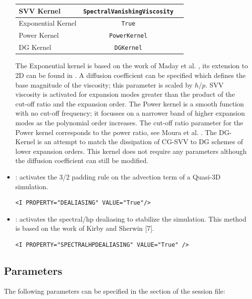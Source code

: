 \begin{itemize}
\begin{center}
\footnotesize
\begin{tabular}{lcc}
\toprule
{SVV Kernel} & {\texttt{SpectralVanishingViscosity}} \\
\midrule
Exponential Kernel & \texttt{True} \\
Power Kernel & \texttt{PowerKernel} \\
DG Kernel & \texttt{DGKernel} \\
\bottomrule
\end{tabular}
\end{center}

The Exponential kernel is based on the work of Maday et al. \cite{yvsiouei93},
its extension to 2D can be found in \cite{rosh06}. A diffusion coefficient can
be specified which defines the base magnitude of the viscosity; this parameter
is scaled by $h/p$. SVV viscosity is activated for expansion modes greater than
the product of the cut-off ratio and the expansion order. The Power kernel is a
smooth function with no cut-off frequency; it focusses on a narrower band of
higher expansion modes as the polynomial order increases. The cut-off ratio
parameter for the Power kernel corresponds to the power ratio, see Moura et al.
\cite{rospjo16}. The DG-Kernel is an attempt to match the dissipation of CG-SVV
to DG schemes of lower expansion orders. This kernel does not require any parameters
although the diffusion coefficient can still be modified.   

\item {}: activates the 3/2 padding rule on the advection term
of a Quasi-3D simulation.
\begin{lstlisting}[style=XMLStyle]
<I PROPERTY="DEALIASING" VALUE="True"/>
\end{lstlisting}


\item {}: activates the spectral/hp dealiasing to
stabilize the simulation. This method is based on the work of Kirby and Sherwin [7].
\begin{lstlisting}[style=XMLStyle]
<I PROPERTY="SPECTRALHPDEALIASING" VALUE="True" />
\end{lstlisting}

\end{itemize}

\subsection{Parameters}
The following parameters can be specified in the  section of
the session file:


